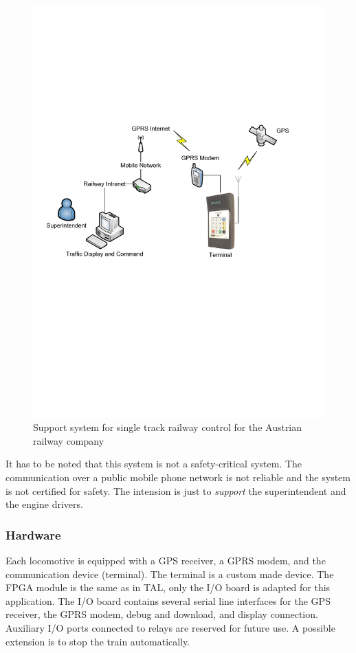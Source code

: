 \begin{figure}
    \centering
    \includegraphics[scale=0.75]{results/zlb}
    \caption{Support system for single track railway control for the Austrian railway company}
    \label{fig:zlb}
\end{figure}

It has to be noted that this system is not a safety-critical system.
The communication over a public mobile phone network is not reliable
and the system is not certified for safety. The intension is just to
\emph{support} the superintendent and the engine drivers.

\subsubsection{Hardware}

Each locomotive is equipped with a GPS receiver, a GPRS modem, and
the communication device (terminal). The terminal is a custom made
device. The FPGA module is the same as in TAL, only the I/O board is
adapted for this application. The I/O board contains several serial
line interfaces for the GPS receiver, the GPRS modem, debug and
download, and display connection. Auxiliary I/O ports connected to
relays are reserved for future use. A possible extension is to stop
the train automatically.


